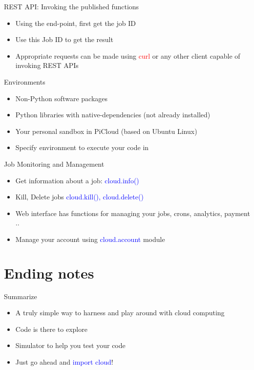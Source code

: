 \documentclass{beamer} \usepackage{fancyvrb} \usepackage{listings}
\begin{document}
      \begin{frame}{REST API: Invoking the published functions}
        \begin{itemize}
        \item Using the end-point, first get the job ID
        \item Use this Job ID to get the result
        \item Appropriate requests can be made using \textcolor{red}{curl} or any other
          client capable of invoking REST APIs
        \end{itemize}
      \end{frame}

      \begin{frame}{Environments}
        \begin{itemize}
        \item Non-Python software packages
        \item Python libraries with native-dependencies (not already
          installed)
        \item Your personal sandbox in PiCloud (based on Ubuntu Linux)
        \item Specify environment to execute your code in
        \end{itemize}
      \end{frame}


      \begin{frame}{Job Monitoring and Management}
        \begin{itemize}
        \item Get information about a job:
          \textcolor{blue}{cloud.info()}
        \item Kill, Delete jobs {\textcolor{blue}{cloud.kill(),
            cloud.delete()}}
        \item Web interface has functions for managing your jobs,
          crons, analytics, payment ..
        \item Manage your account using
          \textcolor{blue}{cloud.account} module
        \end{itemize}

      \end{frame}


      \section{Ending notes}

      \begin{frame}{Summarize}
        \begin{itemize}
        \item A truly simple way to harness and play around with cloud
          computing
        \item Code is there to explore
        \item Simulator to help you test your code
        \item Just go ahead and \textcolor{blue}{import cloud}!
        \end{itemize}

      \end{frame}
      
\end{document}
